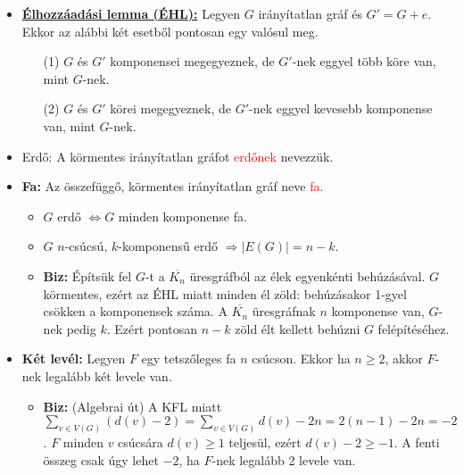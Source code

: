 \documentclass[../../szobeli.tex]{subfiles}
\begin{document}
\begin{center}
    \noindent{}
\end{center}
    \begin{itemize}
        \item \underline{\textbf{Élhozzáadási lemma (ÉHL):}} Legyen $G$ irányítatlan gráf és $G' = G + e$. Ekkor az alábbi két esetből pontosan egy valósul meg. \begin{itemize}
            \item[(1)] $G$ és $G'$ komponensei megegyeznek, de $G'$-nek eggyel több köre van, mint $G$-nek.
            \item[(2)] $G$ és $G'$ körei megegyeznek, de $G'$-nek eggyel kevesebb komponense van, mint $G$-nek. 
        \end{itemize}
        \item Erdő: A körmentes irányítatlan gráfot \textcolor{red}{erdőnek} nevezzük. 
        \item \textbf{Fa:} Az összefüggő, körmentes irányítatlan gráf neve \textcolor{red}{fa}. \begin{itemize}
            \item $G$ erdő $\Longleftrightarrow  G$ minden komponense fa.
            \item $G$ $n$-csúcsú, $k$-komponensű erdő $\Rightarrow |E(G)| = n-k$.
            \item \textbf{Biz:} Építsük fel $G$-t a $\overline{K_n}$ üresgráfból az élek egyenkénti behúzásával. $G$ körmentes, ezért az ÉHL miatt minden él zöld: behúzásakor 1-gyel csökken a komponensek száma. A $\overline{K_n}$ üresgráfnak $n$ komponense van, $G$-nek pedig $k$. Ezért pontosan $n-k$ zöld élt kellett behúzni $G$ felépítéséhez.
        \end{itemize}
        \item \textbf{Két levél:} Legyen $F$ egy tetszőleges fa $n$ csúcson. Ekkor ha $n \geq 2$, akkor $F$-nek legalább két levele van.
        \begin{itemize}
            \item \textbf{Biz:} (Algebrai út) A KFL miatt $\sum_{v\in V(G)}(d(v)-2)=\sum_{v\in V(G)}d(v)-2n=2(n-1)-2n=-2$. $F$ minden $v$ csúcsára $d(v) \geq 1$ teljesül, ezért $d(v) - 2 \geq -1$. A fenti összeg csak úgy lehet $-2$, ha $F$-nek legalább 2 levele van.

\end{itemize}
\end{itemize}
\end{document}
